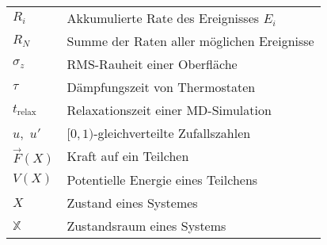 \begin{tabular}{ll}
$R_i$                & Akkumulierte Rate des Ereignisses $E_i$                         \\
$R_N$                & Summe der Raten aller möglichen Ereignisse                      \\
$\sigma_z$           & RMS-Rauheit einer Oberfläche                                    \\
$\tau$               & Dämpfungszeit von Thermostaten                                  \\
$t_\text{relax}$     & Relaxationszeit einer MD-Simulation                             \\
$u$,~$u'$            & $[0,1)$-gleichverteilte Zufallszahlen                           \\
$\vec F(X)$          & Kraft auf ein Teilchen                                          \\
$V(X)$               & Potentielle Energie eines Teilchens                             \\
$X$                  & Zustand eines Systemes                                          \\
$\mathbb{X}$         & Zustandsraum eines Systems                                      \\
\end{tabular}


